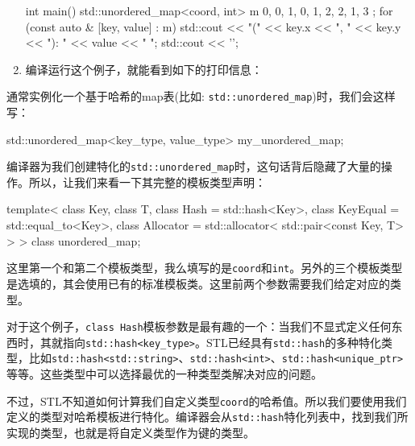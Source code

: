 \begin{enumerate}
\begin{codebox}[cpp]
int main()
{
    std::unordered_map<coord, int> m { 
        { {0, 0}, 1}, 
        { {0, 1}, 2},
        { {2, 1}, 3}
    };
    for (const auto & [key, value] : m) {
        std::cout << "{(" << key.x << ", " << key.y
                 << "): " << value << "} ";
    }
    std::cout << '\n';
}
\end{codebox}

\item 编译运行这个例子，就能看到如下的打印信息：


\end{enumerate}


通常实例化一个基于哈希的map表(比如: \texttt{std::unordered\_map})时，我们会这样写：

\begin{codebox}[cpp]
std::unordered_map<key_type, value_type> my_unordered_map;
\end{codebox}

编译器为我们创建特化的\texttt{std::unordered\_map}时，这句话背后隐藏了大量的操作。所以，让我们来看一下其完整的模板类型声明：

\begin{codebox}[cpp]
template<
    class Key,
    class T,
    class Hash = std::hash<Key>,
    class KeyEqual = std::equal_to<Key>,
    class Allocator = std::allocator< std::pair<const Key, T> >
> class unordered_map;
\end{codebox}

这里第一个和第二个模板类型，我么填写的是\texttt{coord}和\texttt{int}。另外的三个模板类型是选填的，其会使用已有的标准模板类。这里前两个参数需要我们给定对应的类型。

对于这个例子，\texttt{class Hash}模板参数是最有趣的一个：当我们不显式定义任何东西时，其就指向\texttt{std::hash<key\_type>}。STL已经具有\texttt{std::hash}的多种特化类型，比如\texttt{std::hash<std::string>}、\texttt{std::hash<int>}、\texttt{std::hash<unique\_ptr>}等等。这些类型中可以选择最优的一种类型类解决对应的问题。

不过，STL不知道如何计算我们自定义类型\texttt{coord}的哈希值。所以我们要使用我们定义的类型对哈希模板进行特化。编译器会从\texttt{std::hash}特化列表中，找到我们所实现的类型，也就是将自定义类型作为键的类型。

